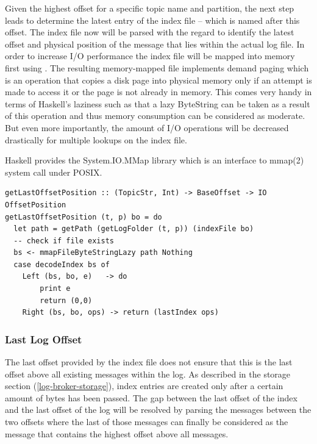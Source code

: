 Given the highest offset for a specific topic name and partition, the next step
leads to determine the latest entry of the index file -- which is named after
this offset. The index file now will be parsed with the regard to identify the
latest offset and physical position of the message that lies within the actual
log file. In order to increase I/O performance the index file will be mapped
into memory first using
. The resulting
memory-mapped file implements demand paging which is an operation that copies a
disk page into physical memory only if an attempt is made to access it or the
page is not already in memory. This comes very handy in terms of Haskell's
laziness such as that a lazy ByteString can be taken as a result of this
operation and thus memory consumption can be considered as moderate. But even
more importantly, the amount of I/O operations will be decreased drastically
for multiple lookups on the index file.

Haskell provides the System.IO.MMap library which is an interface to mmap(2)
system call under POSIX. 


\begin{lstlisting}
getLastOffsetPosition :: (TopicStr, Int) -> BaseOffset -> IO OffsetPosition
getLastOffsetPosition (t, p) bo = do 
  let path = getPath (getLogFolder (t, p)) (indexFile bo)
  -- check if file exists
  bs <- mmapFileByteStringLazy path Nothing
  case decodeIndex bs of
    Left (bs, bo, e)   -> do
        print e
        return (0,0)
    Right (bs, bo, ops) -> return (lastIndex ops)
\end{lstlisting}


\subsubsection{Last Log Offset}

The last offset provided by the index file does not ensure that this is the
last offset above all existing messages within the log. As described in the
storage section (\ref{log-broker-storage}), index entries are created only after a
certain amount of bytes has been passed. The gap between the last offset of the
index and the last offset of the log will be resolved by parsing the messages
between the two offsets where the last of those messages can finally be
considered as the message that contains the highest offset above all messages. 

